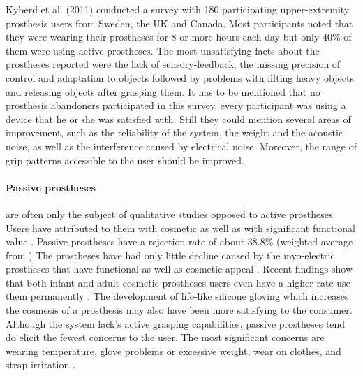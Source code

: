 \documentclass[main]{subfiles}
\begin{document}
Kyberd et al. (2011) \cite{Kyberd2011} conducted a survey with 180 participating upper-extremity prosthesis users from Sweden, the UK and Canada. Most participants noted that they were wearing their prostheses for 8 or more hours each day but only 40\% of them were using active prostheses. The most unsatisfying facts about the prostheses reported were the lack of sensory-feedback, the missing precision of control and adaptation to objects followed by problems with lifting heavy objects and releasing objects after grasping them. It has to be mentioned that no prosthesis abandoners participated in this survey, every participant was using a device that he or she was satisfied with. Still they could mention several areas of improvement, such as the reliability of the system, the weight and the acoustic noise, as well as the interference caused by electrical noise. Moreover, the range of grip patterns accessible to the user should be improved.

\paragraph{Passive prostheses} are often only the subject of qualitative studies opposed to active prostheses. Users have attributed to them with cosmetic as well as with significant functional value \cite{vanLunteren1983,Fraser1998,Pillet2001}. Passive prostheses have a rejection rate of about 38.8\% (weighted average from \cite{vanLunteren1983,Millstein1986,Silcox1993,Keijlaa1993,Leow2001,Dudkiewicz2004})
The prostheses have had only little decline caused by the myo-electric prostheses that have functional as well as cosmetic appeal \cite{vanLunteren1983,Millstein1986,Silcox1993,Keijlaa1993,Leow2001,Dudkiewicz2004}.
Recent findings show that both infant and adult cosmetic prostheses users even have a higher rate use them permanently \cite{Dudkiewicz2004,Crandall2002}. The development of life-like silicone gloving which increases the cosmesis of a prosthesis\cite{Huang2001} may also have been more satisfying to the consumer.
Although the system lack's active grasping capabilities, passive prostheses tend do elicit the fewest concerns to the user. The most significant concerns are wearing temperature, glove problems or excessive weight, wear on clothes, and strap irritation \cite{Keijlaa1993}.
\end{document}
